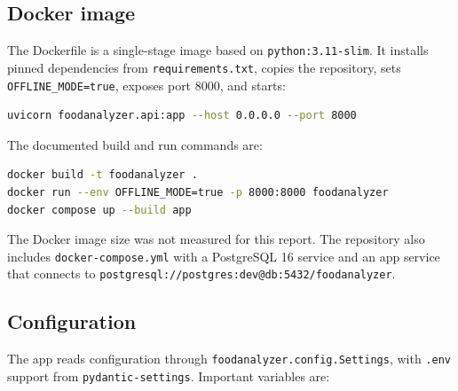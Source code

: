 \documentclass[11pt,a4paper]{article}
\begin{document}
\subsection{Docker image}

The Dockerfile is a single-stage image based on \texttt{python:3.11-slim}. It installs pinned dependencies from \texttt{requirements.txt}, copies the repository, sets \texttt{OFFLINE\_MODE=true}, exposes port 8000, and starts:

\begin{lstlisting}[style=python,language=bash,numbers=none]
uvicorn foodanalyzer.api:app --host 0.0.0.0 --port 8000
\end{lstlisting}

The documented build and run commands are:

\begin{lstlisting}[style=python,language=bash,numbers=none]
docker build -t foodanalyzer .
docker run --env OFFLINE_MODE=true -p 8000:8000 foodanalyzer
docker compose up --build app
\end{lstlisting}

The Docker image size was not measured for this report. The repository also includes \texttt{docker-compose.yml} with a PostgreSQL 16 service and an app service that connects to \texttt{postgresql://postgres:dev@db:5432/foodanalyzer}.

\subsection{Configuration}

The app reads configuration through \texttt{foodanalyzer.config.Settings}, with \texttt{.env} support from \texttt{pydantic-settings}. Important variables are:
\end{document}
